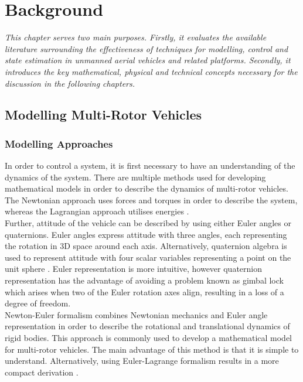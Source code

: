 
\chapter{Background}
\textit{This chapter serves two main purposes. Firstly, it evaluates the available literature surrounding the effectiveness of techniques for modelling, control and state estimation in unmanned aerial vehicles and related platforms. Secondly, it introduces the key mathematical, physical and technical concepts necessary for the discussion in the following chapters.}

\section{Modelling Multi-Rotor Vehicles}
\subsection{Modelling Approaches}
In order to control a system, it is first necessary to have an understanding of the dynamics of the system. There are multiple methods used for developing mathematical models in order to describe the dynamics of multi-rotor vehicles. The Newtonian approach uses forces and torques in order to describe the system, whereas the Lagrangian approach utilises energies \cite{Raine2017}.\\

 Further, attitude of the vehicle can be described by using either Euler angles or quaternions. Euler angles express attitude with three angles, each representing the rotation in 3D space around each axis. Alternatively, quaternion algebra is used to represent attitude with four scalar variables representing a point on the unit sphere \cite{Voight2021}. Euler representation is more intuitive, however quaternion representation has the advantage of avoiding a problem known as gimbal lock which arises when two of the Euler rotation axes align, resulting in a loss of a degree of freedom.\\

Newton-Euler formalism combines Newtonian mechanics and Euler angle representation in order to describe the rotational and translational dynamics of rigid bodies. This approach is commonly used to develop a mathematical model for multi-rotor vehicles. The main advantage of this method is that it is simple to understand. Alternatively, using Euler-Lagrange formalism results in a more compact derivation \cite{Zhang2014}. \\

